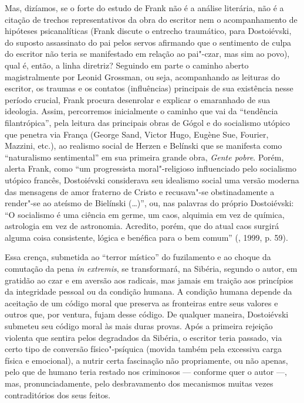 {{Mas, dizíamos, se o forte do estudo de Frank não é a análise literária,
não é a citação de trechos representativos da obra do escritor nem o
acompanhamento de hipóteses psicanalíticas (Frank discute o entrecho
traumático, para Dostoiévski, do suposto assassinato do pai pelos servos
afirmando que o sentimento de culpa do escritor não teria se manifestado
em relação ao pai"-czar, mas sim ao povo), qual é, então, a linha
diretriz? Seguindo em parte o caminho aberto magistralmente por Leonid
Grossman, ou seja, acompanhando as leituras do escritor, os traumas e os
contatos (influências) principais de sua existência nesse período
crucial, Frank procura desenrolar e explicar o emaranhado de sua
ideologia. Assim, percorremos inicialmente o caminho que vai da
``tendência filantrópica'', pela leitura das principais obras de Gógol e
do socialismo utópico que penetra via França (George Sand, Victor Hugo,
Eugène Sue, Fourier, Mazzini, etc.), ao realismo social de Herzen e
Belínski que se manifesta como ``naturalismo sentimental'' em sua
primeira grande obra, \emph{Gente pobre}. Porém, alerta Frank, como ``um
progressista moral"-religioso influenciado pelo socialismo utópico
francês, Dostoiévski considerava seu idealismo social uma versão moderna
das mensagens de amor fraterno de Cristo e recusava"-se obstinadamente a
render"-se ao ateísmo de Bielínski (\ldots{})'', ou, nas palavras do
próprio Dostoiévski: ``O socialismo é uma ciência em germe, um caos,
alquimia em vez de química, astrologia em vez de astronomia. Acredito,
porém, que do atual caos surgirá alguma coisa consistente, lógica e
benéfica para o bem comum'' (, 1999, p. 59).

Essa crença, submetida ao ``terror místico'' do fuzilamento e ao choque
da comutação da pena \emph{in extremis}, se transformará, na Sibéria,
segundo o autor, em gratidão ao czar e em aversão aos radicais, mas
jamais em traição aos princípios da integridade pessoal ou da condição
humana. A condição humana depende da aceitação de um código moral que
preserva as fronteiras entre seus valores e outros que, por ventura,
fujam desse código. De qualquer maneira, Dostoiévski submeteu seu código
moral às mais duras provas. Após a primeira rejeição violenta que
sentira pelos degradados da Sibéria, o escritor teria passado, via certo
tipo de conversão físico"-psíquica (movida também pela excessiva carga
física e emocional), a nutrir certa fascinação não propriamente, ou não
apenas, pelo que de humano teria restado nos criminosos --- conforme quer
o autor ---, mas, pronunciadamente, pelo desbravamento dos mecanismos
muitas vezes contraditórios dos seus feitos.

}}
